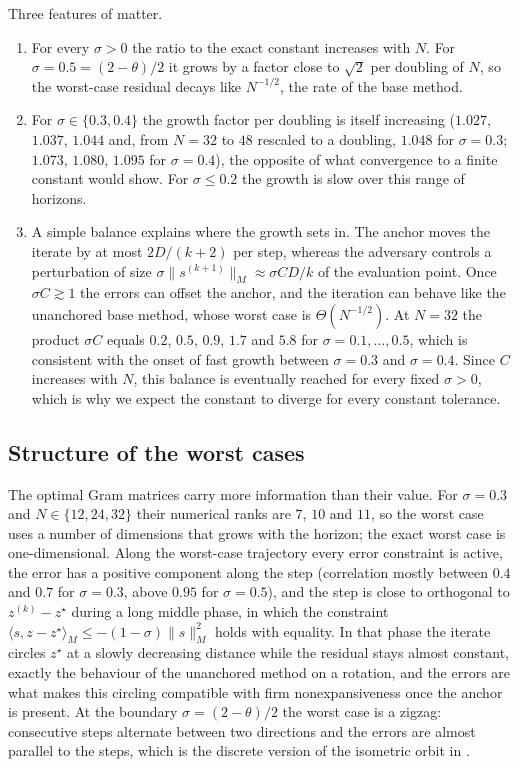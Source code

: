 Three features of  matter.
\begin{enumerate}
    \item For every $\sigma > 0$ the ratio to the exact constant increases with $N$.
    For $\sigma = 0.5 = (2-\theta)/2$ it grows by a factor close to $\sqrt{2}$ per doubling of $N$, so the worst-case residual decays like $N^{-1/2}$, the rate of the base method.
    \item For $\sigma \in \{0.3, 0.4\}$ the growth factor per doubling is itself increasing ($1.027$, $1.037$, $1.044$ and, from $N = 32$ to $48$ rescaled to a doubling, $1.048$ for $\sigma = 0.3$; $1.073$, $1.080$, $1.095$ for $\sigma = 0.4$), the opposite of what convergence to a finite constant would show.
    For $\sigma \le 0.2$ the growth is slow over this range of horizons.
    \item A simple balance explains where the growth sets in.
    The anchor moves the iterate by at most $2D/(k+2)$ per step, whereas the adversary controls a perturbation of size $\sigma\|s^{(k+1)}\|_M \approx \sigma C D/k$ of the evaluation point.
    Once $\sigma C \gtrsim 1$ the errors can offset the anchor, and the iteration can behave like the unanchored base method, whose worst case is $\Theta(N^{-1/2})$.
    At $N = 32$ the product $\sigma C$ equals $0.2$, $0.5$, $0.9$, $1.7$ and $5.8$ for $\sigma = 0.1, \ldots, 0.5$, which is consistent with the onset of fast growth between $\sigma = 0.3$ and $\sigma = 0.4$.
    Since $C$ increases with $N$, this balance is eventually reached for every fixed $\sigma > 0$, which is why we expect the constant to diverge for every constant tolerance.
\end{enumerate}

\subsection{Structure of the worst cases}\label{sec:acc-mechanism}
The optimal Gram matrices carry more information than their value.
For $\sigma = 0.3$ and $N \in \{12, 24, 32\}$ their numerical ranks are $7$, $10$ and $11$, so the worst case uses a number of dimensions that grows with the horizon; the exact worst case is one-dimensional.
Along the worst-case trajectory every error constraint is active, the error has a positive component along the step (correlation mostly between $0.4$ and $0.7$ for $\sigma = 0.3$, above $0.95$ for $\sigma = 0.5$), and the step is close to orthogonal to $z^{(k)} - z^\star$ during a long middle phase, in which the constraint $\langle s, z - z^\star\rangle_M \le -(1-\sigma)\|s\|_M^2$ holds with equality.
In that phase the iterate circles $z^\star$ at a slowly decreasing distance while the residual stays almost constant, exactly the behaviour of the unanchored method on a rotation, and the errors are what makes this circling compatible with firm nonexpansiveness once the anchor is present.
At the boundary $\sigma = (2-\theta)/2$ the worst case is a zigzag: consecutive steps alternate between two directions and the errors are almost parallel to the steps, which is the discrete version of the isometric orbit in .

